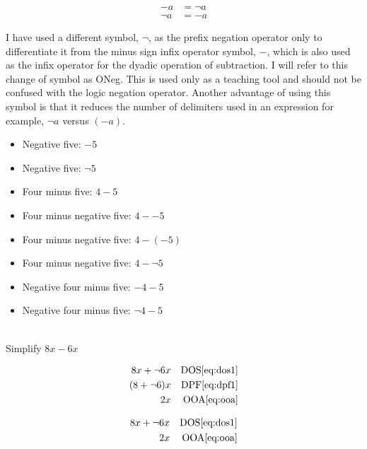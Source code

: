 \documentclass[20150903-160354-rs2.2-MarksMathNotebook.tex]{subfiles}
\begin{document}
\begin{notation}

\begin{subequations}
\begin{align}
-a &= \neg a \label{eq:oneg1} \\
\neg a &= -a \label{eq:oneg2}
\end{align}
\end{subequations}

I have used a different symbol, $\neg$, as the prefix negation operator only to differentiate it from the minus sign infix operator symbol, $-$, which is also used as the infix operator for the dyadic operation of subtraction.  I will refer to this change of symbol as ONeg.  This is used only as a teaching tool and should not be confused with the logic negation operator.  Another advantage of using this symbol is that it reduces the number of delimiters used in an expression for example, $\neg a$ versus $(-a)$.

\begin{itemize}
	\item Negative five: $-5$
	\item Negative five: $\neg 5$
	\item Four minus five: $4-5$
	\item Four minus negative five: $4--5$
	\item Four minus negative five: $4-(-5)$
	\item Four minus negative five: $4-\neg 5$
	\item Negative four minus five: $-4-5$
	\item Negative four minus five: $\neg 4-5$
\end{itemize}

\end{notation}

\begin{example}[id:20141121-190857] \label{20141121-190857} \hfill \\

Simplify $8x-6x$

\soln

\solnsteps
\begin{align*}
8x + \neg 6x && \text{DOS} \eqref{eq:dos1} \\
(8+\neg 6)x && \text{DPF} \eqref{eq:dpf1} \\
2x && \text{OOA} \eqref{eq:ooa}
\end{align*}

\soln

\lesssteps
\begin{align*}
8x + \neg 6x && \text{DOS} \eqref{eq:dos1} \\
2x && \text{OOA} \eqref{eq:ooa}
\end{align*}


\end{example}
\end{document}
